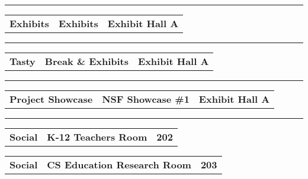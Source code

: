 \vspace{0.5em}
\noindent\rule{5in}{0.02cm}
\vspace{0.5em}
\noindent
{}
\begin{longtable}[l]{@{}p{1in}@{}p{3in}@{}r}
    {\sffamily\large\textbf{Exhibits}} & 
    {\sffamily\large\textbf{Exhibits}} & 
    {\sffamily\large\textbf{Exhibit Hall A}} \\
\end{longtable}    
\vspace{0.5em}
\noindent\rule{5in}{0.02cm}
\vspace{0.5em}
\noindent
{}
\begin{longtable}[l]{@{}p{1in}@{}p{3in}@{}r}
    {\sffamily\large\textbf{Tasty}} & 
    {\sffamily\large\textbf{Break \& Exhibits}} & 
    {\sffamily\large\textbf{Exhibit Hall A}} \\
\end{longtable}    
\vspace{0.5em}
\noindent\rule{5in}{0.02cm}
\vspace{0.5em}
\noindent
{}
\begin{longtable}[l]{@{}p{1in}@{}p{3in}@{}r}
    {\sffamily\large\textbf{Project Showcase}} & 
    {\sffamily\large\textbf{NSF Showcase \#1}} & 
    {\sffamily\large\textbf{Exhibit Hall A}} \\
\end{longtable}    
\vspace{0.5em}
\noindent\rule{5in}{0.02cm}
\vspace{0.5em}
\noindent
{}
\begin{longtable}[l]{@{}p{1in}@{}p{3in}@{}r}
    {\sffamily\large\textbf{Social}} & 
    {\sffamily\large\textbf{K-12 Teachers Room}} & 
    {\sffamily\large\textbf{202}} \\
\end{longtable}    
\begin{longtable}[l]{@{}p{1in}@{}p{3in}@{}r}
    {\sffamily\large\textbf{Social}} & 
    {\sffamily\large\textbf{CS Education Research Room}} & 
    {\sffamily\large\textbf{203}} \\
\end{longtable}    
